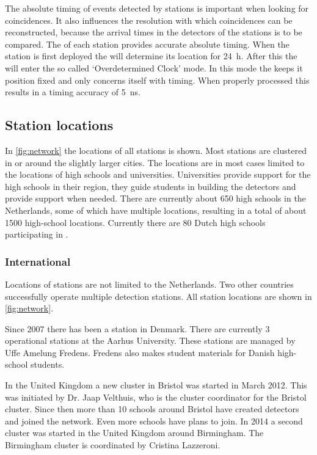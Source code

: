 The absolute timing of events detected by stations is important when looking for coincidences. It also influences the resolution with which coincidences can be reconstructed, because the arrival times in the detectors of the stations is to be compared. The \gps of each station provides accurate absolute timing. When the station is first deployed the \gps will determine its location for \SI{24}{\hour}. After this the \gps will enter the so called `Overdetermined Clock' mode. In this mode the \gps keeps it position fixed and only concerns itself with timing. When properly processed this results in a timing accuracy of \SI{5}{\ns}.

\subsection{Station locations}

In \cref{fig:network} the locations of all \hisparc stations is shown. Most stations are clustered in or around the slightly larger cities. The locations are in most cases limited to the locations of high schools and universities. Universities provide support for the high schools in their region, they guide students in building the detectors and provide support when needed. There are currently about \num{650} high schools in the Netherlands, some of which have multiple locations, resulting in a total of about \num{1500} high-school locations. Currently there are \num{80} Dutch high schools participating in \hisparc.

\subsubsection{International}

Locations of \hisparc stations are not limited to the Netherlands. Two other countries successfully operate multiple detection stations. All station locations are shown in \cref{fig:network}.

Since 2007 there has been a \hisparc station in Denmark. There are currently 3 operational stations at the Aarhus University. These stations are managed by Uffe Amelung Fredens. Fredens also makes student materials for Danish high-school students.

In the United Kingdom a new cluster in Bristol was started in March 2012. This was initiated by Dr. Jaap Velthuis, who is the cluster coordinator for the Bristol cluster. Since then more than 10 schools around Bristol have created detectors and joined the network. Even more schools have plans to join. In 2014 a second cluster was started in the United Kingdom around Birmingham. The Birmingham cluster is coordinated by Cristina Lazzeroni.


